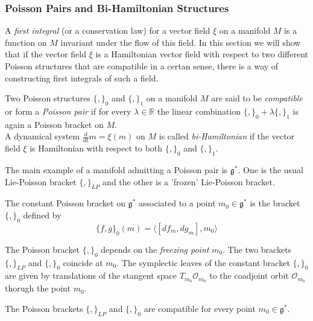 \subsubsection{Poisson Pairs and Bi-Hamiltonian Structures}

\indent A \textit{first integral} (or a conservation law) for a vector field $\xi$ on a manifold $M$ is a function on $M$ invariant under the flow of this field. In this section we will show that if the vector field $\xi$ is a Hamiltonian vector field with respect to two different Poisson structures that are compatible in a certan sense, there is a way of constructing first integrals of such a field.


\begin{defn}

	Two Poisson structures $ \{ , \}_0$ and $ \{ , \}_1$ on a manifold $M$ are said to be \textit{compatible} or form a \textit{Poisson pair} if for every $\lambda \in \mathbb{R}$ the linear combination $ \{ , \}_0 + \lambda \{ , \}_1$ is again a Poisson bracket on $M$.\\
	\indent A dynamical system $ \frac{d}{dt}m = \xi(m)$ on $M$ is called \textit{bi-Hamiltonian} if the vector field $\xi$ is Hamiltonian with respect to both $ \{ , \}_0$ and $ \{ , \}_1$.

\end{defn}

\indent The main example of a manifold admitting a Poisson pair is $ \mathfrak{g}^*$. One is the usual Lie-Poisson bracket $ \{ , \}_{LP}$ and the other is a 'frozen' Lie-Poisson bracket.


\begin{defn}

The constant Poisson bracket on $ \mathfrak{g}^*$ associated to a point $m_0 \in \mathfrak{g}^*$ is the bracket $ \{ , \}_0$ defined by 
\[
	\{ f,g \}_0 (m) = \langle [df_m, dg_m], m_0 \rangle 
\]


\end{defn}

\indent The Poisson bracket $ \{ , \}_0$ depends on the \textit{freezing point} $m_0$. The two brackets $ \{ , \}_{LP}$ and $ \{ , \}_0$ coincide at $m_0$. The symplectic leaves of the constant bracket $ \{ , \}_0$ are given by translations of the stangent space $ T_{m_0} \mathcal{O}_{m_0}$ to the coadjoint orbit $ \mathcal{O}_{m_0}$ thorugh the point $m_0$.


\begin{lem}

	The Poisson brackets $ \{ , \}_{LP}$ and $ \{ , \}_0$ are compatible for every point $m_0 \in \mathfrak{g}^*$.

\end{lem}


